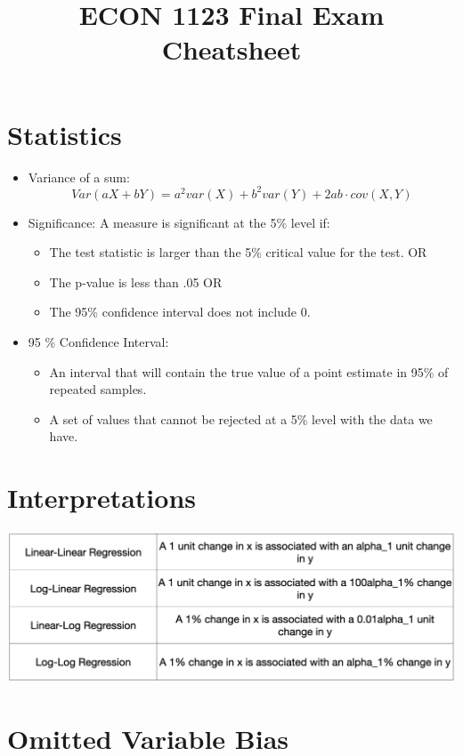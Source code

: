 \documentclass{article}
\title{ECON 1123 Final Exam Cheatsheet}
\begin{document}
\maketitle

\section{Statistics}

\begin{itemize}
    \item Variance of a sum:
    $$Var(aX + bY) = a^2var(X) + b^2var(Y) + 2ab \cdot cov(X, Y)$$
    \item Significance: A measure is significant at the 5\% level if:
    \begin{itemize}
        \item The test statistic is larger than the 5\% critical value for the test. OR 
        \item The p-value is less than .05 OR
        \item The 95\% confidence interval does not include 0.
    \end{itemize}
    \item 95 \% Confidence Interval:
    \begin{itemize}
        \item An interval that will contain the true value of a point estimate in 95\% of repeated samples.
        \item A set of values that cannot be rejected at a 5\% level with the data we have.
    \end{itemize}
\end{itemize}

\section{Interpretations}
 

\includegraphics[scale=.4]{log_table.png}

\section{Omitted Variable Bias}
\end{document}
